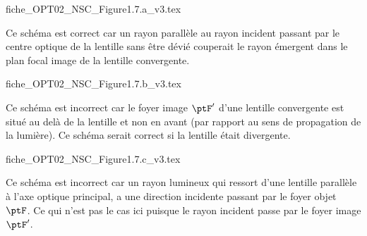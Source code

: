 
\begin{enonce}
\begin{center}
{fiche_OPT02_NSC_Figure1.7.a_v3.tex}
\end{center}
\end{enonce}


\begin{corrige}
Ce schéma est correct car un rayon parallèle au rayon incident passant par le centre optique de la lentille sans être dévié couperait le rayon émergent dans le plan focal image de la lentille convergente.
\end{corrige}




\begin{enonce}
\begin{center}
{fiche_OPT02_NSC_Figure1.7.b_v3.tex}
\end{center}
\end{enonce}


\begin{corrige}
Ce schéma est incorrect car le foyer image $\ptF'$ d'une lentille convergente est situé au delà de la lentille et non en avant (par rapport au sens de propagation de la lumière). Ce schéma serait correct si la lentille était divergente.
\end{corrige}




\begin{enonce}
\begin{center}
{fiche_OPT02_NSC_Figure1.7.c_v3.tex}
\end{center}
\end{enonce}


\begin{corrige}
Ce schéma est incorrect car un rayon lumineux qui ressort d'une lentille parallèle à l'axe optique principal, a une direction incidente passant par le foyer objet $\ptF$. Ce qui n'est pas le cas ici puisque le rayon incident passe par le foyer image $\ptF'$.
\end{corrige}

